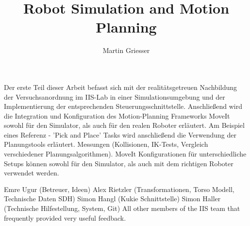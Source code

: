 \documentclass[bachelor]{iisthesis}
\title{Robot Simulation and Motion Planning}
\author{Martin Griesser}
\begin{document}
\maketitle

Der erste Teil dieser Arbeit befasst sich mit der realitätsgetreuen Nachbildung der Versuchsanordnung im IIS-Lab in einer Simulationsumgebung und der Implementierung der entsprechenden Steuerungsschnittstelle. Anschließend wird die Integration und Konfiguration des Motion-Planning Frameworks MoveIt sowohl für den Simulator, als auch für den realen Roboter erläutert. Am Beispiel eines Referenz - 'Pick and Place' Tasks wird anschließend die Verwendung der Planungstools erläutert.
Messungen (Kollisionen, IK-Tests, Vergleich verschiedener Planungsalgorithmen).
MoveIt Konfigurationen für unterschiedliche Setups können sowohl für den Simulator, als auch mit dem richtigen Roboter verwendet werden.

Emre Ugur (Betreuer, Ideen)
Alex Rietzler (Transformationen, Torso Modell, Technische Daten SDH)
Simon Hangl (Kukie Schnittstelle)
Simon Haller (Technische Hilfestellung, System, Git)
All other members of the IIS team that frequently provided very useful feedback.

\tableofcontents
\listoffigures
\listoftables

\uibkdeclaration
\label{chap:declare}








\appendix%


\end{document}
